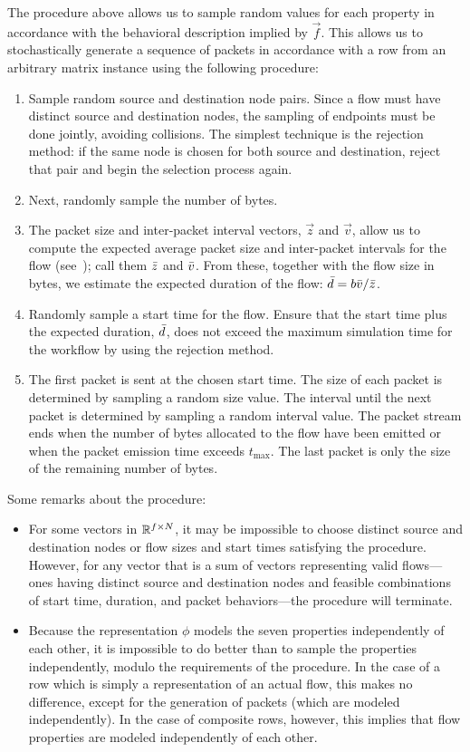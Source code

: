 \documentclass[twocolumn,final]{svjour3}
\begin{document}
The procedure above allows us to sample random values for each property in accordance with the behavioral description implied by $\vec{f}$.
This allows us to stochastically generate a sequence of packets in accordance with a row from an arbitrary  matrix instance using the following procedure:
\begin{enumerate}
\item Sample random source and destination node pairs.
Since a flow must have distinct source and destination nodes, the sampling of endpoints must be done jointly, avoiding collisions.
The simplest technique is the rejection method:
if the same node is chosen for both source and destination, reject that pair and begin the selection process again.
\item Next, randomly sample the number of bytes.
\item The packet size and inter-packet interval vectors, $\vec{z}$ and $\vec{v}$, allow us to compute the expected average packet size and inter-packet intervals for the flow (see~);
call them $\bar{z}$ and $\bar{v}$.
From these, together with the flow size in bytes, we estimate the expected duration of the flow:
$\bar{d} = {b\bar{v}/\bar{z}}$.
\item Randomly sample a start time for the flow. Ensure that the start time plus the expected duration, $\bar{d}$, does not exceed the maximum simulation time for the workflow by using the rejection method.
\item The first packet is sent at the chosen start time.
The size of each packet is determined by sampling a random size value.
The interval until the next packet is determined by sampling a random interval value.
The packet stream ends when the number of bytes allocated to the flow have been emitted or when the packet emission time exceeds $t_{\max}$.
The last packet is only the size of the remaining number of bytes.
\end{enumerate}
Some remarks about the procedure:
\begin{itemize}
\item For some vectors in $\mathbb{R}^{f \times N}$, it may be impossible to choose distinct source and destination nodes or flow sizes and start times satisfying the procedure.
However, for any vector that is a sum of vectors representing valid flows--- ones having distinct source and destination nodes and feasible combinations of start time, duration, and packet behaviors---the procedure will terminate.
\item Because the representation $\phi$ models the seven properties independently of each other, it is impossible to do better than to sample the properties independently, modulo the requirements of the procedure.
In the case of a row which is simply a representation of an actual flow, this makes no difference, except for the generation of packets (which are modeled independently).
In the case of composite rows, however, this implies that flow properties are modeled independently of each other.
\end{itemize}
\end{document}
